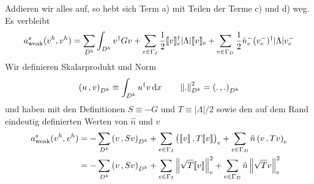 Addieren wir alles auf, so hebt sich Term a) mit Teilen der Terme c) und d) weg. Es verbleibt
\begin{align*}
  a_\text{weak}^s(v^h, v^h) = \sum_{D^k} \int_{D^k} v^{\dagger} G v
    + \sum_{e\in\Gamma_I} \frac{1}{2}\llbracket v \rrbracket_e^{\dagger} |\Lambda|\llbracket v \rrbracket_e
    + \sum_{e\in\Gamma_D} \frac{1}{2}\hat{n}_e^- (v_e^-)^{\dagger} |\Lambda|v_e^-
\end{align*}
Wir definieren Skalarprodukt und Norm
\begin{align}
  \left(u\, ,v\right)_{D^k} \equiv \int_{D^k} u^{\dagger} v \mathop{}\!\mathrm{d} x \qquad \left\lVert.\right\rVert_{D^k}^2 = \left(.\, ,.\right)_{D^k}
\end{align}
und haben mit den Definitionen $S\equiv -G$ und $T\equiv |\Lambda|/2$ sowie den auf dem Rand eindeutig definierten Werten von $\hat{n}$ und $v$
\begin{align}
  a_\text{weak}^s(v^h, v^h) &= -\sum_{D^k} \left(v\, ,Sv\right)_{D^k}
    + \sum_{e\in\Gamma_I} \left(\llbracket v \rrbracket\, ,T\llbracket v \rrbracket\right)_{e}
    + \sum_{e\in\Gamma_D} \hat{n} \left(v\, ,T v\right)_{e}\\
    &= -\sum_{D^k} \left(v\, ,Sv\right)_{D^k}
    + \sum_{e\in\Gamma_I} \left\lVert\sqrt{T}\llbracket v \rrbracket\right\rVert_{e}^2
    + \sum_{e\in\Gamma_D} \hat{n} \left\lVert\sqrt{T}v\right\rVert_{e}^2
\end{align}
